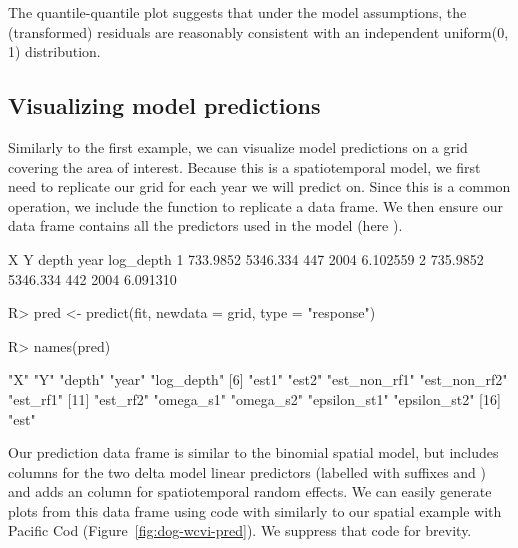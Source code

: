 \documentclass[article]{jss}\usepackage[]{graphicx}\usepackage[dvipsnames]{xcolor}
\newcommand{\fct}[1]{\code{#1()}}
\begin{document}
The quantile-quantile plot suggests that under the model assumptions, the (transformed) residuals are reasonably consistent with an independent uniform(0, 1) distribution.

\subsection{Visualizing model predictions}

Similarly to the first example, we can visualize model predictions on a grid covering the area of interest.
Because this is a spatiotemporal model, we first need to replicate our grid for each year we will predict on.
Since this is a common operation, we include the function \fct{replicate\_df} to replicate a data frame.
We then ensure our data frame contains all the predictors used in the model (here ).

\begin{Schunk}
\begin{Soutput}
         X        Y depth year log_depth
1 733.9852 5346.334   447 2004  6.102559
2 735.9852 5346.334   442 2004  6.091310
\end{Soutput}
\end{Schunk}

\begin{Schunk}
\begin{Sinput}
R> pred <- predict(fit, newdata = grid, type = "response")
\end{Sinput}
\end{Schunk}

\begin{Schunk}
\begin{Sinput}
R> names(pred)
\end{Sinput}
\begin{Soutput}
 [1] "X"           "Y"           "depth"       "year"        "log_depth"  
 [6] "est1"        "est2"        "est_non_rf1" "est_non_rf2" "est_rf1"    
[11] "est_rf2"     "omega_s1"    "omega_s2"    "epsilon_st1" "epsilon_st2"
[16] "est"        
\end{Soutput}
\end{Schunk}

Our prediction data frame is similar to the binomial spatial model, but includes columns for the two delta model linear predictors (labelled with suffixes  and ) and adds an  column for spatiotemporal random effects.
We can easily generate plots from this data frame using  code with \fct{geom\_raster} similarly to our spatial example with Pacific Cod (Figure~\ref{fig:dog-wcvi-pred}).
We suppress that code for brevity.
\end{document}
